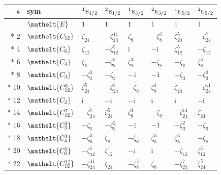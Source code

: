 \documentclass[10pt,a4paper]{article}
\numberwithin{equation}{section}
\newcommand{\eltfont}[1]{{\let\sigma\eltsigma\mathelt{#1}}}
\newcommand{\irr}[1]{\text{\normalfont\scshape #1}}
\newcommand{\conjpair}[1]{{}^{#1}}
\newcommand{\cls}[1]{\eltfont{#1}}
\newcommand{\iunit}{\mathrm{i}}
\newcommand{\rootunity}[1]{\zeta_{#1}}
\begin{document}
{\small\setlength{\tabcolsep}{4pt}
\begin{longtable}{@{}rlllllll@{}}\toprule
$k$ & sym & $\conjpair{1}\irr{e}_{1/2}$ & $\conjpair{2}\irr{e}_{1/2}$ & $\conjpair{1}\irr{e}_{3/2}$ & $\conjpair{2}\irr{e}_{3/2}$ & $\conjpair{1}\irr{e}_{5/2}$ & $\conjpair{2}\irr{e}_{5/2}$\\\midrule\endhead
\bottomrule\endfoot\endlastfoot
0 & $\cls{E}$ & $1$ & $1$ & $1$ & $1$ & $1$ & $1$\\*
2 & $\cls{C_{12}}$ & $\rootunity{24}$ & $-\rootunity{24}^{11}$ & $\rootunity{8}$ & $-\rootunity{8}^{3}$ & $\rootunity{24}^{5}$ & $-\rootunity{24}^{7}$\\*
4 & $\cls{C_{6}}$ & $\rootunity{12}$ & $-\rootunity{12}^{5}$ & $\iunit{}$ & $-\iunit{}$ & $\rootunity{12}^{5}$ & $-\rootunity{12}$\\*
6 & $\cls{C_{4}}$ & $\rootunity{8}$ & $-\rootunity{8}^{3}$ & $\rootunity{8}^{3}$ & $-\rootunity{8}$ & $-\rootunity{8}$ & $\rootunity{8}^{3}$\\*
8 & $\cls{C_{3}}$ & $-\rootunity{3}^{2}$ & $-\rootunity{3}$ & $-1$ & $-1$ & $-\rootunity{3}$ & $-\rootunity{3}^{2}$\\*
10 & $\cls{C_{12}^{5}}$ & $\rootunity{24}^{5}$ & $-\rootunity{24}^{7}$ & $-\rootunity{8}$ & $\rootunity{8}^{3}$ & $\rootunity{24}$ & $-\rootunity{24}^{11}$\\*
12 & $\cls{C_{2}}$ & $\iunit{}$ & $-\iunit{}$ & $-\iunit{}$ & $\iunit{}$ & $\iunit{}$ & $-\iunit{}$\\*
14 & $\cls{C_{12}^{7}}$ & $-\rootunity{24}^{7}$ & $\rootunity{24}^{5}$ & $\rootunity{8}^{3}$ & $-\rootunity{8}$ & $-\rootunity{24}^{11}$ & $\rootunity{24}$\\*
16 & $\cls{C_{3}^{2}}$ & $-\rootunity{3}$ & $-\rootunity{3}^{2}$ & $-1$ & $-1$ & $-\rootunity{3}^{2}$ & $-\rootunity{3}$\\*
18 & $\cls{C_{4}^{3}}$ & $-\rootunity{8}^{3}$ & $\rootunity{8}$ & $-\rootunity{8}$ & $\rootunity{8}^{3}$ & $\rootunity{8}^{3}$ & $-\rootunity{8}$\\*
20 & $\cls{C_{6}^{5}}$ & $-\rootunity{12}^{5}$ & $\rootunity{12}$ & $-\iunit{}$ & $\iunit{}$ & $-\rootunity{12}$ & $\rootunity{12}^{5}$\\*
22 & $\cls{C_{12}^{11}}$ & $-\rootunity{24}^{11}$ & $\rootunity{24}$ & $-\rootunity{8}^{3}$ & $\rootunity{8}$ & $-\rootunity{24}^{7}$ & $\rootunity{24}^{5}$\\
\bottomrule\end{longtable}}
\end{document}
